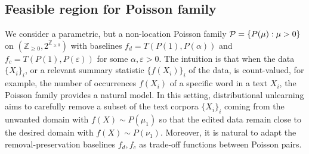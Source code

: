 \subsection{Feasible region for Poisson family}
\vspace{-2mm}
We consider a parametric, but a non-location Poisson family $\mathcal{P}= \{P(\mu): \mu >0\}$ on $(\mathbb{Z}_{\geq 0}, 2^{\mathbb{Z}_{\geq 0}})$ with baselines $f_d=T(P(1), P(\alpha))$ and $f_c=T(P(1), P(\varepsilon))$ for some $\alpha, \varepsilon >0$. The intuition is that when the data $\{X_i\}_i$, or a relevant summary statistic $\{f(X_i)\}_i$ of the data, is count-valued, for example, the number of occurrences $f(X_i)$ of a specific word in a text $X_i$, the Poisson family provides a natural model. In this setting, distributional unlearning aims to carefully remove a subset of the text corpora $\{X_i\}_i$ coming from the unwanted domain with \(f(X) \sim P(\mu_1)\) so that the edited data remain close to the desired domain with \(f(X)\sim P(\nu_1)\).  Moreover, it is natural to adapt the removal-preservation baselines $f_d,f_c$ as trade-off functions between Poisson pairs.

